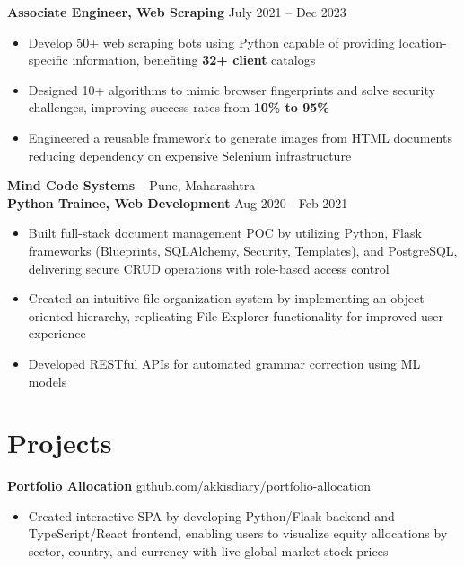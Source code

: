 \documentclass[11pt]{article}       %
\begin{document}
\vspace{-5pt}
\textbf{Associate Engineer, Web Scraping} \hfill July 2021 -- Dec 2023 \\
\vspace{-9pt}
\begin{itemize}
  \item Develop 50+ web scraping bots using Python capable of providing location-specific information, benefiting \textbf{32+ client} catalogs \\ 
  \item Designed 10+ algorithms to mimic browser fingerprints and solve security challenges, improving success rates from \textbf{10\% to 95\%} \\
  \item Engineered a reusable framework to generate images from HTML documents reducing dependency on expensive Selenium infrastructure \\
\end{itemize}

\textbf {Mind Code Systems} -- Pune, Maharashtra \\
\textbf{Python Trainee, Web Development} \hfill Aug 2020 - Feb 2021 \\
\vspace{-9pt}
\begin{itemize}
  \item Built full-stack document management POC by utilizing Python, Flask frameworks (Blueprints, SQLAlchemy, Security, Templates), and PostgreSQL, delivering secure CRUD operations with role-based access control \\
  \item Created an intuitive file organization system by implementing an object-oriented hierarchy, replicating File Explorer functionality for improved user experience \\
  \item Developed RESTful APIs for automated grammar correction using ML models \\
\end{itemize}

\vspace{-18.5pt}

\section*{Projects}
\textbf{Portfolio Allocation} \hfill \href{https://github.com/Akkisdiary/portfolio-allocation}{github.com/akkisdiary/portfolio-allocation} \\
\vspace{-9pt}
\begin{itemize}
  \item Created interactive SPA by developing Python/Flask backend and TypeScript/React frontend, enabling users to visualize equity allocations by sector, country, and currency with live global market stock prices \\
\end{itemize}
\end{document}
